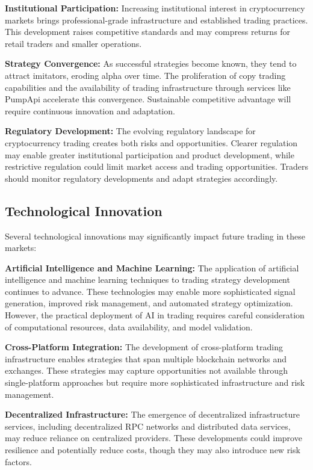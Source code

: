 \documentclass[12pt,a4paper]{article}
\begin{document}
\textbf{Institutional Participation:} Increasing institutional interest in cryptocurrency markets brings professional-grade infrastructure and established trading practices. This development raises competitive standards and may compress returns for retail traders and smaller operations.

\textbf{Strategy Convergence:} As successful strategies become known, they tend to attract imitators, eroding alpha over time. The proliferation of copy trading capabilities and the availability of trading infrastructure through services like PumpApi accelerate this convergence. Sustainable competitive advantage will require continuous innovation and adaptation.

\textbf{Regulatory Development:} The evolving regulatory landscape for cryptocurrency trading creates both risks and opportunities. Clearer regulation may enable greater institutional participation and product development, while restrictive regulation could limit market access and trading opportunities. Traders should monitor regulatory developments and adapt strategies accordingly.

\subsection{Technological Innovation}

Several technological innovations may significantly impact future trading in these markets:

\textbf{Artificial Intelligence and Machine Learning:} The application of artificial intelligence and machine learning techniques to trading strategy development continues to advance. These technologies may enable more sophisticated signal generation, improved risk management, and automated strategy optimization. However, the practical deployment of AI in trading requires careful consideration of computational resources, data availability, and model validation.

\textbf{Cross-Platform Integration:} The development of cross-platform trading infrastructure enables strategies that span multiple blockchain networks and exchanges. These strategies may capture opportunities not available through single-platform approaches but require more sophisticated infrastructure and risk management.

\textbf{Decentralized Infrastructure:} The emergence of decentralized infrastructure services, including decentralized RPC networks and distributed data services, may reduce reliance on centralized providers. These developments could improve resilience and potentially reduce costs, though they may also introduce new risk factors.
\end{document}
